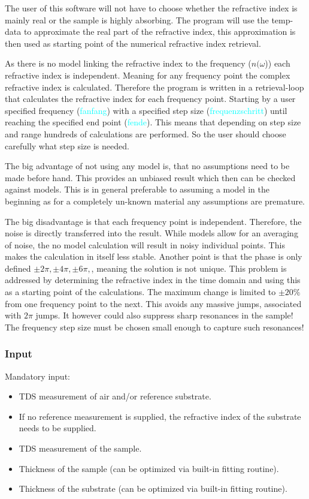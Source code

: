 \documentclass[12pt]{article}
\begin{document}
The user of this software will not have to choose whether the refractive index is mainly real or the sample is highly absorbing. The program will use the temp-data to approximate the real part of the refractive index, this approximation is then used as starting point of the numerical refractive index retrieval. 

As there is no model linking the refractive index to the frequency ($n(\omega$)) each refractive index is independent. Meaning for any frequency point the complex refractive index is calculated. Therefore the program is written in a retrieval-loop that calculates the refractive index for each frequency point. Starting by a user specified frequency (\textcolor{cyan}{fanfang}) with a specified step size (\textcolor{cyan}{frequenzschritt}) until reaching the specified end point (\textcolor{cyan}{fende}). This means that depending on step size and range hundreds of calculations are performed. So the user should choose carefully what step size is needed. 

The big advantage of not using any model is, that no assumptions need to be made before hand. This provides an unbiased result which then can be checked against models. This is in general preferable to assuming a model in the beginning as for a completely un-known material any assumptions are premature. 

The big disadvantage is that each frequency point is independent. Therefore, the noise is directly transferred into the result. While models allow for an averaging of noise, the no model calculation will result in noisy individual points. This makes the calculation in itself less stable. Another point is that the phase is only defined $\pm 2 \pi,  \pm 4 \pi, \pm 6 \pi,   $, meaning the solution is not unique. This problem is addressed by determining the refractive index in the time domain and using this as a starting point of the calculations. The maximum change is limited to $\pm 20 \%$ from one frequency point to the next. This avoids any massive jumps, associated with $2\pi $ jumps. It however could also suppress sharp resonances in the sample! The frequency step size must be chosen small enough to capture such resonances! 
\subsubsection{Input}
Mandatory input:
\begin{itemize}
	\item TDS measurement of air and/or reference substrate.
	\item If no reference measurement is supplied, the refractive index of the substrate needs to be supplied.
	\item TDS measurement of the sample.
	\item Thickness of the sample (can be optimized via built-in fitting routine).
	\item Thickness of the substrate (can be optimized via built-in fitting routine).
\end{itemize}
\end{document}
